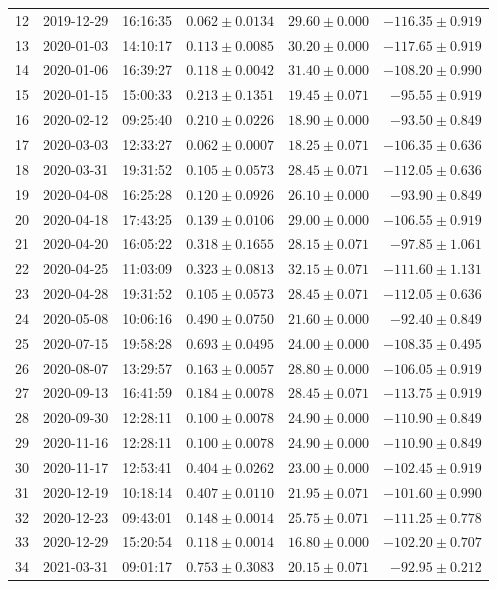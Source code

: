 \documentclass[times,twocolumn,final,authoryear]{elsarticle}
\begin{document}
\begin{table}
\begin{tabular}{rrrrrr}
12 & 2019-12-29 & 16:16:35 & $0.062\pm 0.0134$ & $29.60 \pm 0.000$ & $-116.35 \pm  0.919$\\
13 & 2020-01-03 & 14:10:17 & $0.113\pm 0.0085$ & $30.20 \pm 0.000$ & $-117.65 \pm  0.919$\\
14 & 2020-01-06 & 16:39:27 & $0.118\pm 0.0042$ & $31.40 \pm 0.000$ & $-108.20 \pm  0.990$\\
15 & 2020-01-15 & 15:00:33 & $0.213\pm 0.1351$ & $19.45 \pm 0.071$ & $-95.55 \pm   0.919$\\
16 & 2020-02-12 & 09:25:40 & $0.210\pm 0.0226$ & $18.90 \pm 0.000$ & $-93.50 \pm   0.849$\\
17 & 2020-03-03 & 12:33:27 & $0.062\pm 0.0007$ & $18.25 \pm 0.071$ & $-106.35 \pm 0.636$\\
18 & 2020-03-31 & 19:31:52 & $0.105\pm 0.0573$ & $28.45 \pm 0.071$ & $-112.05 \pm  0.636$\\
19 & 2020-04-08 & 16:25:28 & $0.120\pm 0.0926$ & $26.10 \pm 0.000$ & $-93.90 \pm   0.849$\\
20 & 2020-04-18 & 17:43:25 & $0.139\pm 0.0106$ & $29.00 \pm 0.000$ & $-106.55 \pm  0.919$\\
21 & 2020-04-20 & 16:05:22 & $0.318\pm 0.1655$ & $28.15 \pm 0.071$ & $-97.85 \pm   1.061$\\
22 & 2020-04-25 & 11:03:09 & $0.323\pm 0.0813$ & $32.15 \pm 0.071$ & $-111.60 \pm  1.131$\\
23 & 2020-04-28 & 19:31:52 & $0.105\pm 0.0573$ & $28.45 \pm 0.071$ & $-112.05 \pm  0.636$\\
24 & 2020-05-08 & 10:06:16 & $0.490\pm 0.0750$ & $21.60 \pm 0.000$ & $-92.40 \pm   0.849$\\
25 & 2020-07-15 & 19:58:28 & $0.693\pm 0.0495$ & $24.00 \pm 0.000$ & $-108.35 \pm  0.495$\\
26 & 2020-08-07 & 13:29:57 & $0.163\pm 0.0057$ & $28.80 \pm 0.000$ & $-106.05 \pm  0.919$\\
27 & 2020-09-13 & 16:41:59 & $0.184\pm 0.0078$ & $28.45 \pm 0.071$ & $-113.75 \pm  0.919$\\
28 & 2020-09-30 & 12:28:11 & $0.100\pm 0.0078$ & $24.90 \pm 0.000$ & $-110.90 \pm  0.849$\\
29 & 2020-11-16 & 12:28:11 & $0.100\pm 0.0078$ & $24.90 \pm 0.000$ & $-110.90 \pm  0.849$\\
30 & 2020-11-17 & 12:53:41 & $0.404\pm 0.0262$ & $23.00 \pm 0.000$ & $-102.45 \pm  0.919$\\
31 & 2020-12-19 & 10:18:14 & $0.407\pm 0.0110$ & $21.95 \pm 0.071$ & $-101.60 \pm  0.990$\\
32 & 2020-12-23 & 09:43:01 & $0.148\pm 0.0014$ & $25.75 \pm 0.071$ & $-111.25 \pm  0.778$\\
33 & 2020-12-29 & 15:20:54 & $0.118\pm 0.0014$ & $16.80 \pm 0.000$ & $-102.20 \pm  0.707$\\
34 & 2021-03-31 & 09:01:17 & $0.753\pm 0.3083$ & $20.15 \pm 0.071$ & $-92.95 \pm  0.212$\\\hline
\end{tabular}
\end{table}
\end{document}

